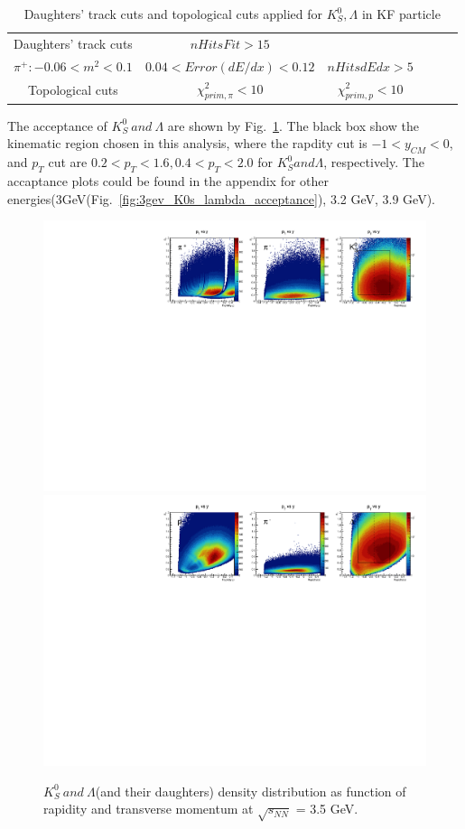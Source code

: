 \begin{table}
    \centering
    \begin{tabular}{|c|c|c|l|l|l|} \hline 
         Daughters' track cuts&  $nHitsFit > 15$ &\makecell{$|n\sigma_{\pi,p}-shift| < 3$, \\$\pi^{+}: -0.06 < m^2 < 0.1$}&$0.04 < Error(dE/dx ) < 0.12$ &$nHitsdEdx > 5$\\ \hline 
         Topological cuts&  $\chi^2_{prim, \pi}<10$&   $\chi^2_{prim, p}<10$& &\\ \hline
    \end{tabular}
    \caption{Daughters' track cuts and topological cuts applied for $K^{0}_{S}, \Lambda$ in KF particle}
    \label{tab:K0s_lam_cut}
\end{table}
The acceptance of $K^{0}_{S}~and~\Lambda$ are shown by Fig.~\ref{fig:3p5_K0s_lambda_acceptance}. 
The black box show the kinematic region chosen in this analysis, where the rapdity cut is $-1<y_{CM}<0$, 
and $p_T$ cut are $0.2<p_T<1.6, 0.4<p_T<2.0$ for $K^{0}_{S} and \Lambda$, respectively.
The accaptance plots could be found in the appendix for other energies(3GeV(Fig.~\ref{fig:3gev_K0s_lambda_acceptance}), 3.2 GeV, 3.9 GeV).



\begin{figure}[hbt!]
\centering
\includegraphics[width=0.55\linewidth]{figures/chapter02/3p5gev_K0s_acceptance.pdf}
\includegraphics[width=0.55\linewidth]{figures/chapter02/3p5gev_lambda_acceptance.pdf}
\caption{$K^{0}_{S}~and~\Lambda$(and their daughters) density distribution as function of rapidity and transverse momentum at $\sqrt{s_{NN}}$ = 3.5 GeV.}
\label{fig:3p5_K0s_lambda_acceptance}
\end{figure}



